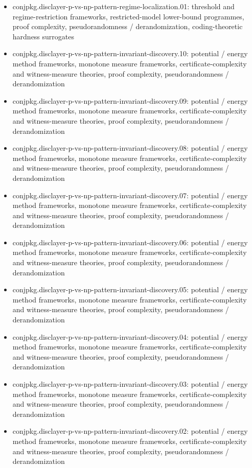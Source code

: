 \documentclass[11pt]{article}
\begin{document}
\begin{itemize}
\item conjpkg.disclayer-p-vs-np-pattern-regime-localization.01: threshold and regime-restriction frameworks, restricted-model lower-bound programmes, proof complexity, pseudorandomness / derandomization, coding-theoretic hardness surrogates
\item conjpkg.disclayer-p-vs-np-pattern-invariant-discovery.10: potential / energy method frameworks, monotone measure frameworks, certificate-complexity and witness-measure theories, proof complexity, pseudorandomness / derandomization
\item conjpkg.disclayer-p-vs-np-pattern-invariant-discovery.09: potential / energy method frameworks, monotone measure frameworks, certificate-complexity and witness-measure theories, proof complexity, pseudorandomness / derandomization
\item conjpkg.disclayer-p-vs-np-pattern-invariant-discovery.08: potential / energy method frameworks, monotone measure frameworks, certificate-complexity and witness-measure theories, proof complexity, pseudorandomness / derandomization
\item conjpkg.disclayer-p-vs-np-pattern-invariant-discovery.07: potential / energy method frameworks, monotone measure frameworks, certificate-complexity and witness-measure theories, proof complexity, pseudorandomness / derandomization
\item conjpkg.disclayer-p-vs-np-pattern-invariant-discovery.06: potential / energy method frameworks, monotone measure frameworks, certificate-complexity and witness-measure theories, proof complexity, pseudorandomness / derandomization
\item conjpkg.disclayer-p-vs-np-pattern-invariant-discovery.05: potential / energy method frameworks, monotone measure frameworks, certificate-complexity and witness-measure theories, proof complexity, pseudorandomness / derandomization
\item conjpkg.disclayer-p-vs-np-pattern-invariant-discovery.04: potential / energy method frameworks, monotone measure frameworks, certificate-complexity and witness-measure theories, proof complexity, pseudorandomness / derandomization
\item conjpkg.disclayer-p-vs-np-pattern-invariant-discovery.03: potential / energy method frameworks, monotone measure frameworks, certificate-complexity and witness-measure theories, proof complexity, pseudorandomness / derandomization
\item conjpkg.disclayer-p-vs-np-pattern-invariant-discovery.02: potential / energy method frameworks, monotone measure frameworks, certificate-complexity and witness-measure theories, proof complexity, pseudorandomness / derandomization

\end{itemize}
\end{document}
